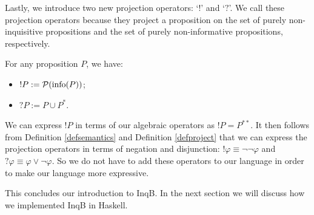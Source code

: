 Lastly, we introduce two new projection operators: `$!$' and `$?$'. We call these projection operators because they project a proposition on the set of purely non-inquisitive propositions and the set of purely non-informative propositions, respectively.

\begin{defi}\label{defproject}
 For any proposition $P$, we have:
 \begin{itemize}
     \item $!P:= \mathcal{P}(\textrm{info}(P))$;
     \item $?P:= P\cup P^*$.
 \end{itemize}
\end{defi}

We can express $!P$ in terms of our algebraic operators as $!P=P^{**}$. It then follows from Definition \ref{defsemantics} and Definition \ref{defproject} that we can express the projection operators in terms of negation and disjunction: $!\varphi \equiv \neg\neg\varphi$ and $?\varphi\equiv \varphi \lor \neg \varphi$. So we do not have to add these operators to our language in order to make our language more expressive.

This concludes our introduction to \textsf{InqB}. In the next section we will discuss how we implemented \textsf{InqB} in Haskell. 


